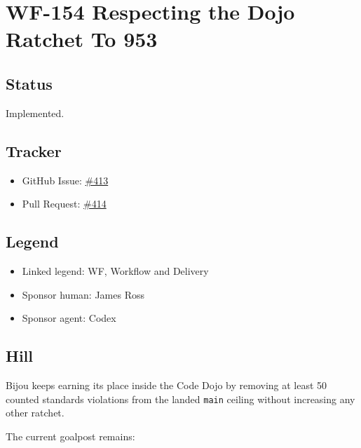 \chapter{WF-154 Respecting the Dojo Ratchet To 953}\label{record-236}

\smallskip

\section{Status}\label{record-236-status}

Implemented.

\section{Tracker}\label{record-236-tracker}

\begin{itemize}
\tightlist
\item
  GitHub Issue: \href{https://github.com/flyingrobots/bijou/issues/413}{\#413}
\item
  Pull Request: \href{https://github.com/flyingrobots/bijou/pull/414}{\#414}
\end{itemize}

\section{Legend}\label{record-236-legend}

\begin{itemize}
\tightlist
\item
  Linked legend: WF, Workflow and Delivery
\item
  Sponsor human: James Ross
\item
  Sponsor agent: Codex
\end{itemize}

\section{Hill}\label{record-236-hill}

Bijou keeps earning its place inside the Code Dojo by removing at least 50 counted standards violations from the landed \texttt{m\allowbreak{}a\allowbreak{}i\allowbreak{}n} ceiling without increasing any other ratchet.

The current goalpost remains:

